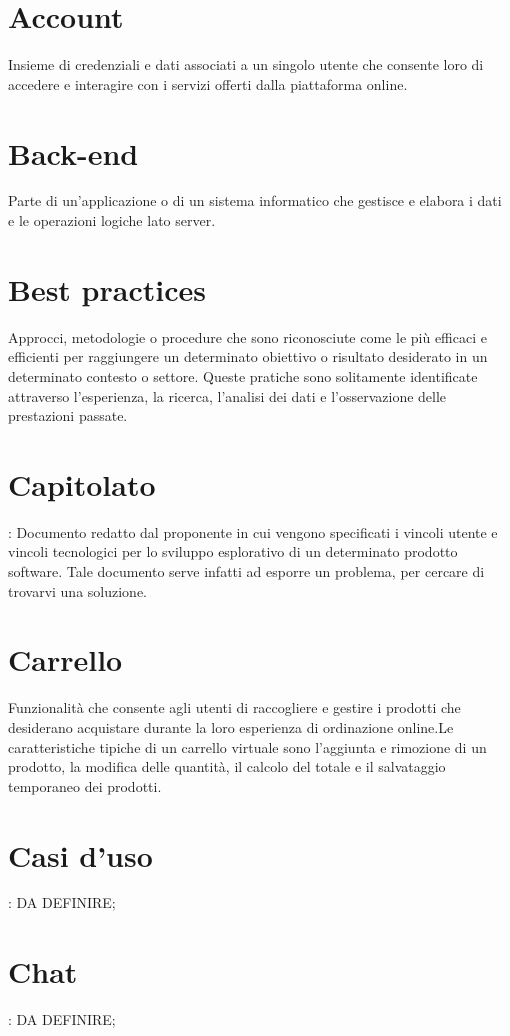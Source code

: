 \section{Account}
Insieme di credenziali e dati associati a un singolo utente che consente loro di accedere e interagire con i servizi offerti dalla piattaforma online.

\section{Back-end}
Parte di un'applicazione o di un sistema informatico che gestisce e elabora i dati e le operazioni logiche lato server.

\section{Best practices}
Approcci, metodologie o procedure che sono riconosciute come le più efficaci e efficienti per raggiungere un determinato obiettivo o risultato desiderato in un determinato contesto o settore. Queste pratiche sono solitamente identificate attraverso l'esperienza, la ricerca, l'analisi dei dati e l'osservazione delle prestazioni passate.

\section{Capitolato}:
Documento redatto dal proponente in cui vengono specificati i vincoli utente e vincoli tecnologici per lo sviluppo esplorativo di un determinato prodotto software. Tale documento serve infatti ad esporre un problema, per cercare di trovarvi una soluzione.

\section{Carrello}
Funzionalità che consente agli utenti di raccogliere e gestire i prodotti che desiderano acquistare durante la loro esperienza di ordinazione online.Le caratteristiche tipiche di un carrello virtuale sono l'aggiunta e rimozione di un prodotto, la modifica delle quantità, il calcolo del totale e il salvataggio temporaneo dei prodotti.

\section{Casi d’uso}: DA DEFINIRE;
\section{Chat}: DA DEFINIRE;
